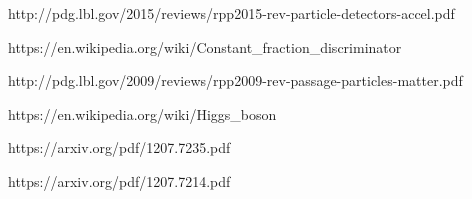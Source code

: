 http://pdg.lbl.gov/2015/reviews/rpp2015-rev-particle-detectors-accel.pdf
\label{pdg_scintillators}

https://en.wikipedia.org/wiki/Constant\_fraction\_discriminator
\label{discriminator}

http://pdg.lbl.gov/2009/reviews/rpp2009-rev-passage-particles-matter.pdf
\label{bethebloch}

https://en.wikipedia.org/wiki/Higgs\_boson
\label{higgs}


https://arxiv.org/pdf/1207.7235.pdf
\label{higgs_cms}

https://arxiv.org/pdf/1207.7214.pdf
\label{higgs_atlas}